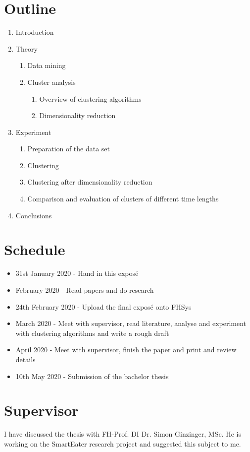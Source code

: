 \documentclass[12pt,a4paper]{article}
\begin{document}
\section*{Outline}

\begin{enumerate}
	\item Introduction
	\item Theory
	\begin{enumerate}
		\item Data mining 
		\item Cluster analysis
		\begin{enumerate}
			\item Overview of clustering algorithms
			\item Dimensionality reduction
		\end{enumerate}
	\end{enumerate}
	\item Experiment
	\begin{enumerate}
		\item Preparation of the data set
		\item Clustering
		\item Clustering after dimensionality reduction
		\item Comparison and evaluation of clusters of different time lengths
	\end{enumerate}
	\item Conclusions
\end{enumerate}

\nocite{*}
\printbibliography

\section*{Schedule}

\begin{itemize}
	\item 31st January 2020 - Hand in this exposé
	\item February 2020 - Read papers and do research
	\item 24th February 2020 - Upload the final exposé onto FHSys
	\item March 2020 - Meet with supervisor, read literature, analyse and experiment with clustering algorithms and write a rough draft
	\item April 2020 - Meet with supervisor, finish the paper and print and review details
	\item 10th May 2020 - Submission of the bachelor thesis
\end{itemize}

\section*{Supervisor}

I have discussed the thesis with FH-Prof. DI Dr. Simon Ginzinger, MSc. He is working on the SmartEater research project and suggested this subject to me.
\end{document}
